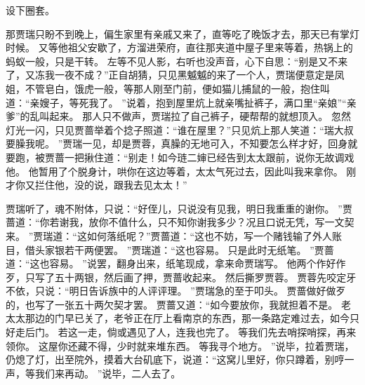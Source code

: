 设下圈套。
\par
那贾瑞只盼不到晚上，偏生家里有亲戚又来了，直等吃了晚饭才去，那天已有掌灯时候。
又等他祖父安歇了，方溜进荣府，直往那夹道中屋子里来等着，热锅上的蚂蚁一般，只是干转。
左等不见人影，右听也没声音，心下自思：“别是又不来了，又冻我一夜不成？”正自胡猜，只见黑魆魆的来了一个人，贾瑞便意定是凤姐，不管皂白，饿虎一般，等那人刚至门前，便如猫儿捕鼠的一般，抱住叫道：“亲嫂子，等死我了。
”说着，抱到屋里炕上就亲嘴扯裤子，满口里“亲娘”“亲爹”的乱叫起来。
那人只不做声，贾瑞拉了自己裤子，硬帮帮的就想顶入。
忽然灯光一闪，只见贾蔷举着个捻子照道：“谁在屋里？”只见炕上那人笑道：“瑞大叔要臊我呢。
”贾瑞一见，却是贾蓉，真臊的无地可入，不知要怎么样才好，回身就要跑，被贾蔷一把揪住道：“别走！如今琏二婶已经告到太太跟前，说你无故调戏他。
他暂用了个脱身计，哄你在这边等着，太太气死过去，因此叫我来拿你。
刚才你又拦住他，没的说，跟我去见太太！”\par
贾瑞听了，魂不附体，只说：“好侄儿，只说没有见我，明日我重重的谢你。
”贾蔷道：“你若谢我，放你不值什么，只不知你谢我多少？况且口说无凭，写一文契来。
”贾瑞道：“这如何落纸呢？”贾蔷道：“这也不妨，写一个赌钱输了外人账目，借头家银若干两便罢。
”贾瑞道：“这也容易。
只是此时无纸笔。
”贾蔷道：“这也容易。
”说罢，翻身出来，纸笔现成，拿来命贾瑞写。
他两个作好作歹，只写了五十两银，然后画了押，贾蔷收起来。
然后撕罗贾蓉。
贾蓉先咬定牙不依，只说：“明日告诉族中的人评评理。
”贾瑞急的至于叩头。
贾蔷做好做歹的，也写了一张五十两欠契才罢。
贾蔷又道：“如今要放你，我就担着不是。
老太太那边的门早已关了，老爷正在厅上看南京的东西，那一条路定难过去，如今只好走后门。
若这一走，倘或遇见了人，连我也完了。
等我们先去哨探哨探，再来领你。
这屋你还藏不得，少时就来堆东西。
等我寻个地方。
”说毕，拉着贾瑞，仍熄了灯，出至院外，摸着大台矶底下，说道：“这窝儿里好，你只蹲着，别哼一声，等我们来再动。
”说毕，二人去了。
\par
